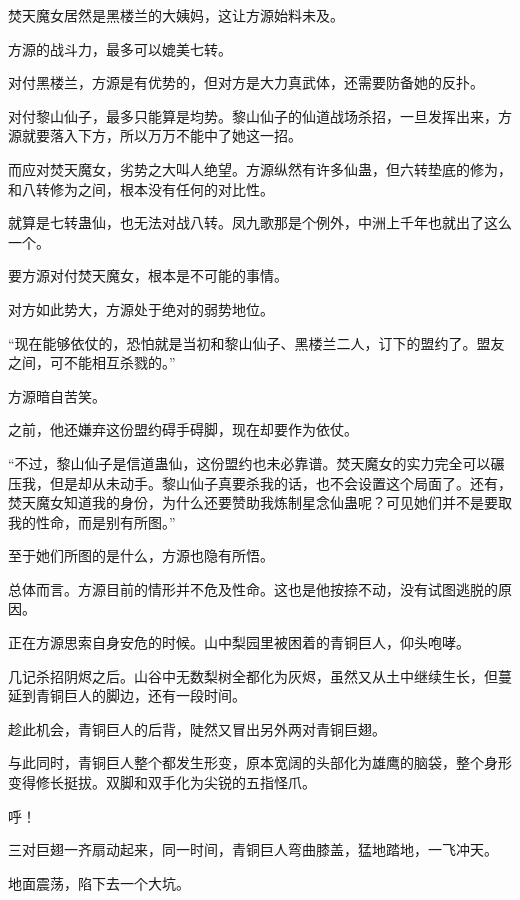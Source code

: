 
\begin{this_body}



焚天魔女居然是黑楼兰的大姨妈，这让方源始料未及。

方源的战斗力，最多可以媲美七转。

对付黑楼兰，方源是有优势的，但对方是大力真武体，还需要防备她的反扑。

对付黎山仙子，最多只能算是均势。黎山仙子的仙道战场杀招，一旦发挥出来，方源就要落入下方，所以万万不能中了她这一招。

而应对焚天魔女，劣势之大叫人绝望。方源纵然有许多仙蛊，但六转垫底的修为，和八转修为之间，根本没有任何的对比性。

就算是七转蛊仙，也无法对战八转。凤九歌那是个例外，中洲上千年也就出了这么一个。

要方源对付焚天魔女，根本是不可能的事情。

对方如此势大，方源处于绝对的弱势地位。

“现在能够依仗的，恐怕就是当初和黎山仙子、黑楼兰二人，订下的盟约了。盟友之间，可不能相互杀戮的。”

方源暗自苦笑。

之前，他还嫌弃这份盟约碍手碍脚，现在却要作为依仗。

“不过，黎山仙子是信道蛊仙，这份盟约也未必靠谱。焚天魔女的实力完全可以碾压我，但是却从未动手。黎山仙子真要杀我的话，也不会设置这个局面了。还有，焚天魔女知道我的身份，为什么还要赞助我炼制星念仙蛊呢？可见她们并不是要取我的性命，而是别有所图。”

至于她们所图的是什么，方源也隐有所悟。

总体而言。方源目前的情形并不危及性命。这也是他按捺不动，没有试图逃脱的原因。

正在方源思索自身安危的时候。山中梨园里被困着的青铜巨人，仰头咆哮。

几记杀招阴烬之后。山谷中无数梨树全都化为灰烬，虽然又从土中继续生长，但蔓延到青铜巨人的脚边，还有一段时间。

趁此机会，青铜巨人的后背，陡然又冒出另外两对青铜巨翅。

与此同时，青铜巨人整个都发生形变，原本宽阔的头部化为雄鹰的脑袋，整个身形变得修长挺拔。双脚和双手化为尖锐的五指怪爪。

呼！

三对巨翅一齐扇动起来，同一时间，青铜巨人弯曲膝盖，猛地踏地，一飞冲天。

地面震荡，陷下去一个大坑。


\end{this_body}
